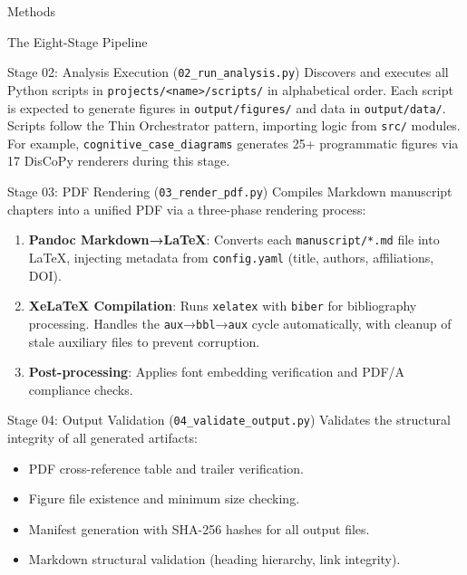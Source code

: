 \documentclass[
  ignorenonframetext,
]{beamer}
\providecommand{\tightlist}{%
  \setlength{\itemsep}{0pt}\setlength{\parskip}{0pt}}
\begin{document}
\begin{frame}[fragile]{Methods}
\begin{block}{The Eight-Stage Pipeline}
\begin{block}{Stage 02: Analysis Execution
(\texttt{02\_run\_analysis.py})}
\protect{}\label{stage-02-analysis-execution-02_run_analysis.py}
Discovers and executes all Python scripts in
\texttt{projects/\textless{}name\textgreater{}/scripts/} in alphabetical
order. Each script is expected to generate figures in
\texttt{output/figures/} and data in \texttt{output/data/}. Scripts
follow the Thin Orchestrator pattern, importing logic from \texttt{src/}
modules. For example, \texttt{cognitive\_case\_diagrams} generates 25+
programmatic figures via 17 DisCoPy renderers during this stage.
\end{block}

\begin{block}{Stage 03: PDF Rendering (\texttt{03\_render\_pdf.py})}
\protect{}\label{stage-03-pdf-rendering-03_render_pdf.py}
Compiles Markdown manuscript chapters into a unified PDF via a
three-phase rendering process:

\begin{enumerate}
\tightlist
\item
  \textbf{Pandoc Markdown→LaTeX}: Converts each \texttt{manuscript/*.md}
  file into LaTeX, injecting metadata from \texttt{config.yaml} (title,
  authors, affiliations, DOI).
\item
  \textbf{XeLaTeX Compilation}: Runs \texttt{xelatex} with
  \texttt{biber} for bibliography processing. Handles the
  \texttt{aux}→\texttt{bbl}→\texttt{aux} cycle automatically, with
  cleanup of stale auxiliary files to prevent corruption.
\item
  \textbf{Post-processing}: Applies font embedding verification and
  PDF/A compliance checks.
\end{enumerate}
\end{block}

\begin{block}{Stage 04: Output Validation
(\texttt{04\_validate\_output.py})}
\protect{}\label{stage-04-output-validation-04_validate_output.py}
Validates the structural integrity of all generated artifacts:

\begin{itemize}
\tightlist
\item
  PDF cross-reference table and trailer verification.
\item
  Figure file existence and minimum size checking.
\item
  Manifest generation with SHA-256 hashes for all output files.
\item
  Markdown structural validation (heading hierarchy, link integrity).
\end{itemize}
\end{block}


\end{block}
\end{frame}
\end{document}
